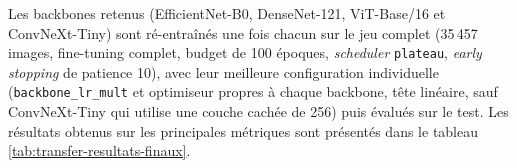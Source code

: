 Les backbones retenus (EfficientNet-B0, DenseNet-121, ViT-Base/16 et ConvNeXt-Tiny) sont ré-entraînés une fois chacun sur le jeu complet (35\,457 images, fine-tuning complet, budget de 100 époques, \emph{scheduler} \texttt{plateau}, \emph{early stopping} de patience 10), avec leur meilleure configuration individuelle (\texttt{backbone\_lr\_mult} et optimiseur propres à chaque backbone, tête linéaire, sauf ConvNeXt-Tiny qui utilise une couche cachée de 256) puis évalués sur le test.
Les résultats obtenus sur les principales métriques sont présentés dans le tableau \ref{tab:transfer-resultats-finaux}.

\begin{table}[H]
  \centering
  \renewcommand{\arraystretch}{1.15}
  \caption{Métriques de test des runs finaux \emph{transfer learning} (tâche \texttt{type}, 10 classes).
Le rappel critique groupé (\texttt{grouped\_critical\_recall}) et le rappel minimum \emph{par classe} (\texttt{min\_critical\_recall}, promyélocyte) sont définis comme au tableau~\ref{tab:baseline-resultats-finaux}.}
  \label{tab:transfer-resultats-finaux}
\end{table}

